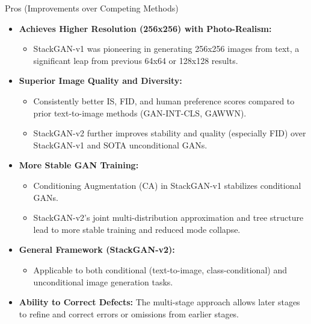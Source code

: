 \documentclass{beamer}
\newcommand{\paperfigure}[3][width=\textwidth]{%
    \begin{figure}%
        \centering%
        \texttt{[image: figures/\#2.png]}%
        \caption{#3 (Source:~\cite{stackgan++})}%
    \end{figure}%
}
\begin{document}
\begin{frame}{Pros (Improvements over Competing Methods)}
    \begin{itemize}
        \item \textbf{Achieves Higher Resolution (256x256) with Photo-Realism:}
            \begin{itemize}
                \item StackGAN-v1 was pioneering in generating 256x256 images from text, a significant leap from previous 64x64 or 128x128 results.
            \end{itemize}
        \item \textbf{Superior Image Quality and Diversity:}
            \begin{itemize}
                \item Consistently better IS, FID, and human preference scores compared to prior text-to-image methods (GAN-INT-CLS, GAWWN).
                \item StackGAN-v2 further improves stability and quality (especially FID) over StackGAN-v1 and SOTA unconditional GANs.
            \end{itemize}
        \item \textbf{More Stable GAN Training:}
            \begin{itemize}
                \item Conditioning Augmentation (CA) in StackGAN-v1 stabilizes conditional GANs.
                \item StackGAN-v2's joint multi-distribution approximation and tree structure lead to more stable training and reduced mode collapse.
            \end{itemize}
        \item \textbf{General Framework (StackGAN-v2):}
            \begin{itemize}
                \item Applicable to both conditional (text-to-image, class-conditional) and unconditional image generation tasks.
            \end{itemize}
        \item \textbf{Ability to Correct Defects:} The multi-stage approach allows later stages to refine and correct errors or omissions from earlier stages.
    \end{itemize}
\end{frame}
\end{document}
